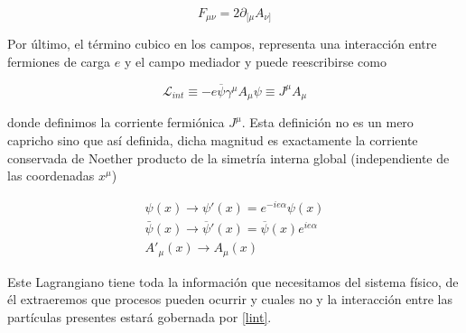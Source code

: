 \documentclass[tickz]{article}
\numberwithin{equation}{section}
\begin{document}
\begin{equation*}
F_{\mu\nu} = 2 \partial_{[\mu}A_{\nu]}
\end{equation*}


Por último, el término cubico en los campos, representa
una interacción entre fermiones de carga $ e $ y el campo mediador y puede reescribirse como

\begin{equation}\label{lint}
\mathscr{L}_{int}\equiv-e\overline{\psi}\gamma^{\mu}A_{\mu}\psi\equiv J^{\mu}A_{\mu}
\end{equation}

donde definimos la corriente fermiónica $J^{\mu}$. Esta definición no es un mero capricho sino que así definida, dicha magnitud es exactamente la corriente conservada de Noether producto de la simetría interna global (independiente de las coordenadas $ x^{\mu} $)

\begin{equation*}
\begin{aligned}
\psi(x) \longrightarrow \psi'(x)=e^{-ie\alpha}\psi(x)\\
\bar{\psi}(x) \longrightarrow \overline{\psi}'(x)=\overline{\psi}(x)e^{ie\alpha}\\
A'_{\mu}(x) \longrightarrow A_{\mu}(x) 
\end{aligned}
\end{equation*}

Este Lagrangiano tiene toda la información que necesitamos
del sistema físico, de él extraeremos que procesos pueden
ocurrir y cuales no y la interacción entre las partículas presentes estará gobernada por \ref{lint}.\\
\end{document}
